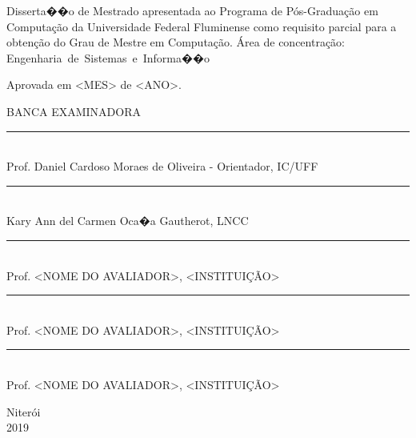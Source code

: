 \noindent
\begin{flushright}
\begin{minipage}[t]{8cm}

Disserta��o de Mestrado apresentada ao Programa de P\'{o}s-Gradua\c{c}\~{a}o em Computa\c{c}\~{a}o da Universidade Federal Fluminense como requisito parcial para a obten\c{c}\~{a}o do \mbox{Grau} de Mestre em Computa\c{c}\~{a}o. \'{A}rea de concentra\c{c}\~{a}o: \mbox{Engenharia de Sistemas e Informa��o} %

\end{minipage}
\end{flushright}
\vspace{1.0 cm}
\noindent
Aprovada em <MES> de <ANO>. \\
\begin{flushright}
  \parbox{11cm}
  {
  \begin{center}
  BANCA EXAMINADORA \\
  \vspace{6mm}
  \rule{11cm}{.1mm} \\
    Prof. Daniel Cardoso Moraes de Oliveira - Orientador, IC/UFF \\
    \vspace{6mm}
  \rule{11cm}{.1mm} \\
    Kary Ann del Carmen Oca�a Gautherot, LNCC\\
    \vspace{6mm}
  \rule{11cm}{.1mm} \\
    Prof. <NOME DO AVALIADOR>, <INSTITUI\c{C}\~AO>\\
  \vspace{4mm}
  \rule{11cm}{.1mm} \\
    Prof. <NOME DO AVALIADOR>, <INSTITUI\c{C}\~AO>\\
    \vspace{6mm}
  \rule{11cm}{.1mm} \\
    Prof. <NOME DO AVALIADOR>, <INSTITUI\c{C}\~AO>\\
  \vspace{6mm}
  \end{center}
  }
\end{flushright}
\begin{center}
  \vspace{4mm}
  Niter\'{o}i \\
  2019

\end{center}


